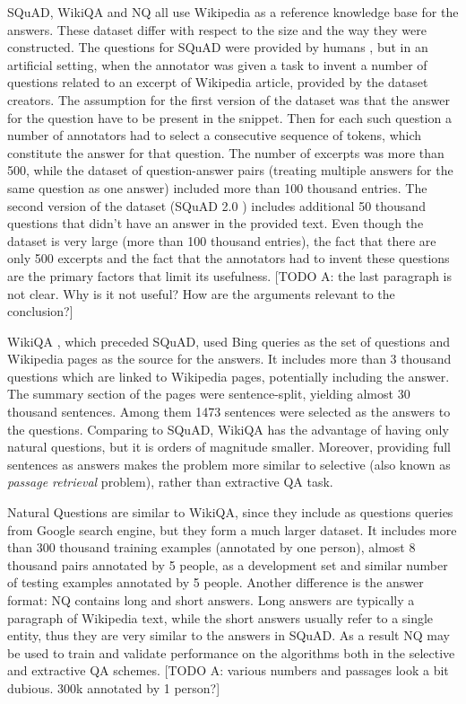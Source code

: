\documentclass{IOS-Book-Article}
\begin{document}
SQuAD, WikiQA and NQ all use Wikipedia as a reference knowledge base for the answers. These dataset
differ with respect to the size and the way they were constructed. The questions for SQuAD were provided by humans \cite{rajpurkar2016squad}, but in an artificial setting, when the annotator was given a task to invent a number of questions related to an excerpt of Wikipedia article, provided by the dataset creators. The assumption for the first version of the dataset was that the answer for
the question have to be present in the snippet. Then for each such question a number of annotators had to select a consecutive sequence of tokens, which constitute the answer for that question. The number of excerpts was more than 500, while the dataset of question-answer pairs (treating multiple answers for the same question as one answer) included more than 100 thousand
entries. The second version of the dataset (SQuAD 2.0 \cite{rajpurkar2018know}) includes additional 50 thousand questions that didn't have an answer in the provided text. Even though the dataset is very large (more than 100 thousand entries), the fact that there are only 500 excerpts and the fact that the annotators had to invent these questions are the primary factors that limit its usefulness. [TODO A: the last paragraph is not clear. Why is it not useful? How are the arguments relevant to the conclusion?]

WikiQA \cite{yang2015wikiqa}, which preceded SQuAD, used Bing queries as the set of questions and Wikipedia pages as the source for the answers. It includes more than 3 thousand questions which are linked to Wikipedia pages, potentially including the answer. The summary section of the pages were sentence-split, yielding almost 30 thousand sentences. Among them 1473 sentences were selected as the answers to the questions. Comparing to SQuAD, WikiQA has the advantage of having only natural questions, but it is orders of magnitude smaller. Moreover, providing full sentences as answers makes the problem more similar to selective (also known as \textit{passage retrieval} problem), rather than extractive QA task.

Natural Questions \cite{kwiatkowski2019natural} are similar to WikiQA, since they include as questions queries from Google search engine, but they form a much larger dataset. It includes more than 300 thousand training examples (annotated by one person), almost 8 thousand pairs annotated by 5 people, as a development set and  similar number of testing examples annotated by 5 people. Another difference is the answer format: NQ contains long and short answers. Long answers are typically a paragraph of Wikipedia text, while the short answers usually refer to a single entity, thus they
are very similar to the answers in SQuAD. As a result NQ may be used to train and validate performance on the algorithms both in the selective and extractive QA schemes. [TODO A: various numbers and passages look a bit dubious. 300k annotated by 1 person?]
\end{document}
